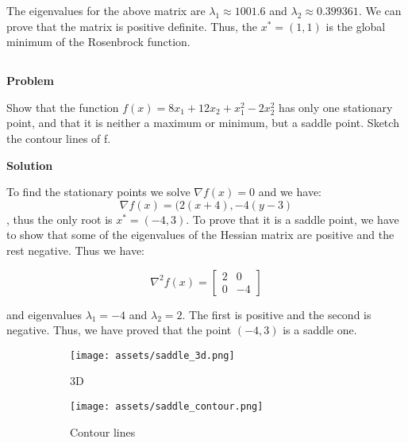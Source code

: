\documentclass[a4paper,11pt]{article}
\numberwithin{equation}{section} %
\begin{document}
The eigenvalues for the above matrix are $\lambda_1 \approx 1001.6$ and $\lambda_2 \approx 0.399361$. We can prove that the matrix is positive definite. Thus, the $x^{*} = (1,1)$ is the global minimum of the Rosenbrock function.

\subsection{}

\textbf{Problem}

Show that the function $f(x) = 8x_1 + 12x_2 + x_1^2 - 2x_2^2$ has only one stationary
point, and that it is neither a maximum or minimum, but a saddle point. Sketch the contour
lines of f.

\textbf{Solution}


To find the stationary points we solve $\nabla f(x) = 0$ and we have:
\begin{equation}
    \nabla f(x) = (2(x+4), -4(y-3)
\end{equation}
, thus the only root is $x^{*} = (-4, 3)$. To prove that it is a saddle point, we have to show that some of the eigenvalues of the Hessian matrix are positive and the rest negative. Thus we have:

\begin{equation}
    \nabla^2 f(x) =
    \begin{bmatrix}
        2 & 0 \\
        0 & -4
    \end{bmatrix}
\end{equation}

and eigenvalues $\lambda_1 = -4$ and $\lambda_2 = 2$. The first is positive and the second is negative. Thus, we have proved that the point $(-4, 3)$ is a saddle one.

\begin{figure}[h!]
     \centering
     \begin{subfigure}[b]{0.45\textwidth}
         \centering
         \texttt{[image: assets/saddle\_3d.png]}
         \caption{3D}
     \end{subfigure}
     \hfill
     \begin{subfigure}[b]{0.45\textwidth}
         \centering
         \texttt{[image: assets/saddle\_contour.png]}
         \caption{Contour lines}
     \end{subfigure}
    \caption{}
\end{figure}

\subsection{}
\end{document}
